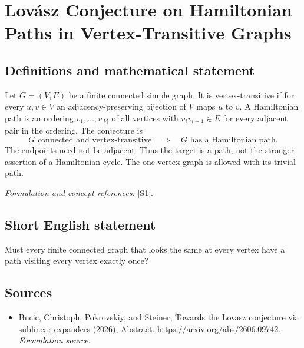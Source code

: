 \documentclass[11pt]{article}
\begin{document}
\section*{\texorpdfstring{Lovász Conjecture on Hamiltonian Paths in Vertex-Transitive Graphs}{Lovász Conjecture on Hamiltonian Paths in Vertex-Transitive Graphs}}\label{436}
\subsection{Definitions and mathematical statement}
Let $G=(V,E)$ be a finite connected simple graph. It is vertex-transitive if for every $u,v\in V$ an adjacency-preserving bijection of $V$ maps $u$ to $v$. A Hamiltonian path is an ordering $v_1,\ldots,v_{|V|}$ of all vertices with $v_iv_{i+1}\in E$ for every adjacent pair in the ordering. The conjecture is
\[
 G\text{ connected and vertex-transitive}
 \quad\Longrightarrow\quad G\text{ has a Hamiltonian path}.
\]
The endpoints need not be adjacent. Thus the target is a path, not the stronger assertion of a Hamiltonian cycle. The one-vertex graph is allowed with its trivial path.
\par\smallskip\textit{Formulation and concept references:} \href{https://arxiv.org/abs/2606.09742}{[S1]}.

\subsection{Short English statement}
Must every finite connected graph that looks the same at every vertex have a path visiting every vertex exactly once?
\subsection{Sources}
\begin{itemize}
\item[S1]Bucic, Christoph, Pokrovskiy, and Steiner, Towards the Lovasz conjecture via sublinear expanders (2026), Abstract.
\url{https://arxiv.org/abs/2606.09742}.
\textit{Formulation source.}
\end{itemize}
\end{document}
